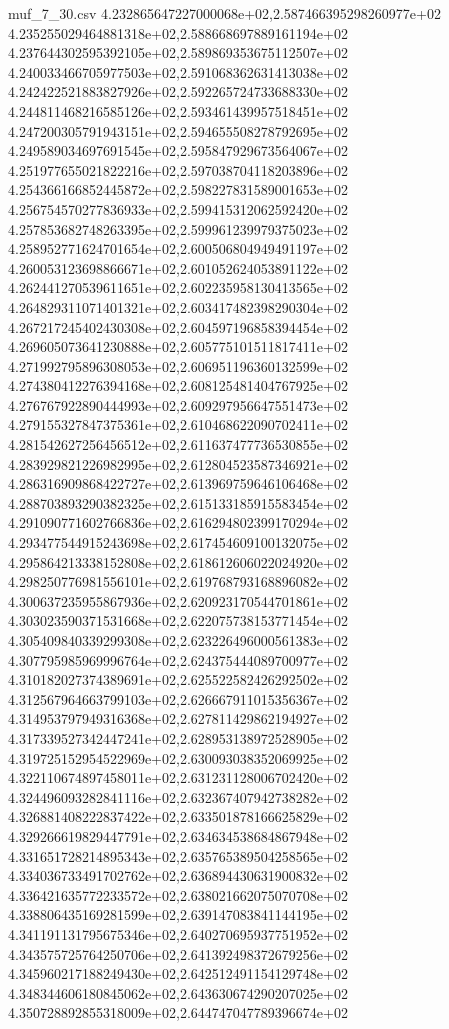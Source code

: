 \begin{filecontents*}{muf_7_30.csv}
4.232865647227000068e+02,2.587466395298260977e+02
4.235255029464881318e+02,2.588668697889161194e+02
4.237644302595392105e+02,2.589869353675112507e+02
4.240033466705977503e+02,2.591068362631413038e+02
4.242422521883827926e+02,2.592265724733688330e+02
4.244811468216585126e+02,2.593461439957518451e+02
4.247200305791943151e+02,2.594655508278792695e+02
4.249589034697691545e+02,2.595847929673564067e+02
4.251977655021822216e+02,2.597038704118203896e+02
4.254366166852445872e+02,2.598227831589001653e+02
4.256754570277836933e+02,2.599415312062592420e+02
4.257853682748263395e+02,2.599961239979375023e+02
4.258952771624701654e+02,2.600506804949491197e+02
4.260053123698866671e+02,2.601052624053891122e+02
4.262441270539611651e+02,2.602235958130413565e+02
4.264829311071401321e+02,2.603417482398290304e+02
4.267217245402430308e+02,2.604597196858394454e+02
4.269605073641230888e+02,2.605775101511817411e+02
4.271992795896308053e+02,2.606951196360132599e+02
4.274380412276394168e+02,2.608125481404767925e+02
4.276767922890444993e+02,2.609297956647551473e+02
4.279155327847375361e+02,2.610468622090702411e+02
4.281542627256456512e+02,2.611637477736530855e+02
4.283929821226982995e+02,2.612804523587346921e+02
4.286316909868422727e+02,2.613969759646106468e+02
4.288703893290382325e+02,2.615133185915583454e+02
4.291090771602766836e+02,2.616294802399170294e+02
4.293477544915243698e+02,2.617454609100132075e+02
4.295864213338152808e+02,2.618612606022024920e+02
4.298250776981556101e+02,2.619768793168896082e+02
4.300637235955867936e+02,2.620923170544701861e+02
4.303023590371531668e+02,2.622075738153771454e+02
4.305409840339299308e+02,2.623226496000561383e+02
4.307795985969996764e+02,2.624375444089700977e+02
4.310182027374389691e+02,2.625522582426292502e+02
4.312567964663799103e+02,2.626667911015356367e+02
4.314953797949316368e+02,2.627811429862194927e+02
4.317339527342447241e+02,2.628953138972528905e+02
4.319725152954522969e+02,2.630093038352069925e+02
4.322110674897458011e+02,2.631231128006702420e+02
4.324496093282841116e+02,2.632367407942738282e+02
4.326881408222837422e+02,2.633501878166625829e+02
4.329266619829447791e+02,2.634634538684867948e+02
4.331651728214895343e+02,2.635765389504258565e+02
4.334036733491702762e+02,2.636894430631900832e+02
4.336421635772233572e+02,2.638021662075070708e+02
4.338806435169281599e+02,2.639147083841144195e+02
4.341191131795675346e+02,2.640270695937751952e+02
4.343575725764250706e+02,2.641392498372679256e+02
4.345960217188249430e+02,2.642512491154129748e+02
4.348344606180845062e+02,2.643630674290207025e+02
4.350728892855318009e+02,2.644747047789396674e+02

\end{filecontents*}

